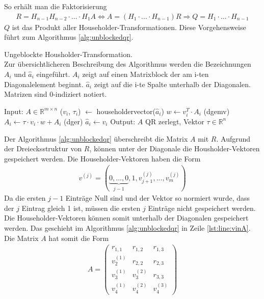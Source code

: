 So erhält man die Faktorisierung
\begin{align*}
R = H_{n-1} H_{n-2}\cdot ...\cdot H_1 A \Leftrightarrow A = (H_1\cdot ...\cdot H_{n-1})R \Rightarrow Q = H_1\cdot ... \cdot H_{n-1}
\end{align*}
$Q$ ist das Produkt aller Householder-Transformationen.
Diese Vorgehensweise führt zum Algorithmus \ref{alg:unblockedqr}. 
\begin{algorithm}[H]
	\caption{Ungeblockte Housholder-Transformation. \\
		Zur übersichtlicheren Beschreibung des Algorithmus werden die Bezeichnungen $A_i$ und $\hat{a}_i$ eingeführt.	$A_i$ zeigt auf einen Matrixblock der am i-ten Diagonalelement beginnt. $\hat{a}_i$ zeigt auf die i-te Spalte unterhalb der Diagonalen. Matrizen sind 0-indiziert notiert.}
	\begin{algorithmic}[1]
	\State Input: $A \in \mathbb{R}^{m \times n}$
		\State ($v_i$, $\tau_i$) $\leftarrow$ householdervector($\hat{a}_i$)
		\State $w \leftarrow v_i^T \cdot A_i$ (dgemv)
		\State $ A_i \leftarrow \tau \cdot v_i \cdot w + A_i $ (dger)
			\State $\hat{a}_i \leftarrow v_i$ \label{lst:line:vinA}
		\EndIf
	\EndFor	
	\State Output: $A$ QR zerlegt, Vektor $\tau \in \mathbb{R}^n$
\end{algorithmic} 
\label{alg:unblockedqr}
\end{algorithm}

Der Algorithmus \ref{alg:unblockedqr} überschreibt die Matrix $A$ mit $R$.
Aufgrund der Dreiecksstruktur von $R$,
können unter der Diagonale die Housholder-Vektoren gespeichert werden. 
Die Householder-Vektoren haben die Form 
\begin{align*}
v^{(j)} = ( \underbrace{0,...,0}_{j-1},1,	v_{j+1}^{(j)},...,v_{m}^{(j)}  )
\end{align*}
Da die ersten $j-1$ Einträge Null sind und der Vektor so normiert wurde, dass der $j$ Eintrag gleich 1 ist, müssen die ersten $j$ Einträge nicht gespeichert werden.
Die Householder-Vektoren können somit unterhalb der Diagonalen gespeichert werden. Das geschieht im Algorithmus \ref{alg:unblockedqr} in Zeile \ref{lst:line:vinA}.
Die Matrix $A$ hat somit die Form
\begin{align*}
	A = 
	\left(\begin{array}{ccc}
	r_{1,1}   &  r_{1,2}  & r_{1,3} \\ 
	v_2^{(1)} &  r_{2,2}  & r_{2,3} \\ 
	v_3^{(1)} & v_3^{(2)} & r_{3,3} \\ 
	v_4^{(1)} & v_4^{(2)} & v_4^{(3)}
	\end{array} \right) 
\end{align*}

